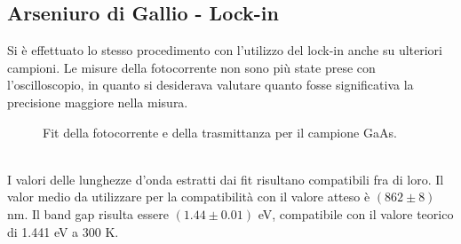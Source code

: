 \documentclass[11pt]{article} %
\begin{document}
\subsection{Arseniuro di Gallio - Lock-in}
Si è effettuato lo stesso procedimento con l'utilizzo del lock-in anche su ulteriori campioni. Le misure della fotocorrente non sono più state prese con l'oscilloscopio, in quanto si desiderava valutare quanto fosse significativa la precisione maggiore nella misura.
\begin{figure}[!h]
\centering
\caption{Fit della fotocorrente e della trasmittanza per il campione GaAs.}
\end{figure}
\\I valori delle lunghezze d'onda estratti dai fit risultano compatibili fra di loro. Il valor medio da utilizzare per la compatibilità con il valore atteso è $\left(862\pm8\right)$ nm. Il band gap risulta essere $\left(1.44\pm0.01\right)$ eV, compatibile con il valore teorico di 1.441 eV a 300 K.
\end{document}
